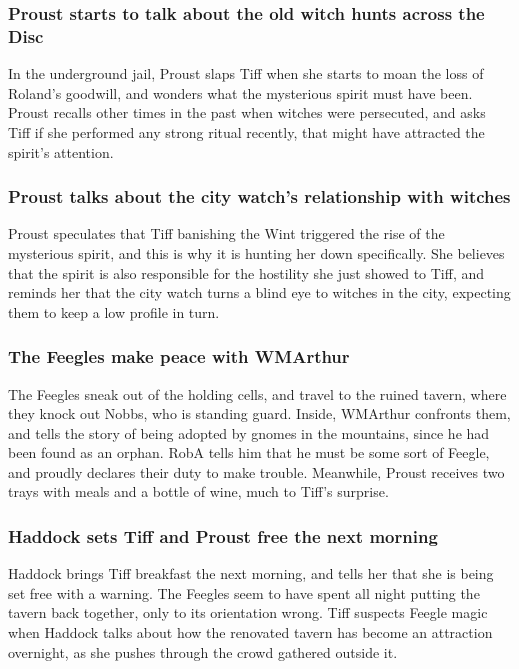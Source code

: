 \subsubsection{\Gls{Proust} starts to talk about the old witch hunts across the Disc}
In the underground jail, \Gls{Proust} slaps \Gls{Tiff} when she starts to moan the loss of
\Gls{Roland}'s goodwill, and wonders what the mysterious spirit must have been. \Gls{Proust} recalls
other times in the past when witches were persecuted, and asks \Gls{Tiff} if she performed any
strong ritual recently, that might have attracted the spirit's attention.

\subsubsection{\Gls{Proust} talks about the city watch's relationship with witches}
\Gls{Proust} speculates that \Gls{Tiff} banishing the \Gls{Wint} triggered the rise of the
mysterious spirit, and this is why it is hunting her down specifically. She believes that the spirit
is also responsible for the hostility she just showed to \Gls{Tiff}, and reminds her that the city
watch turns a blind eye to witches in the city, expecting them to keep a low profile in turn.

\subsubsection{The Feegles make peace with \Gls{WMArthur}}
The Feegles sneak out of the holding cells, and travel to the ruined tavern, where they knock out
\Gls{Nobbs}, who is standing guard. Inside, \Gls{WMArthur} confronts them, and tells the story of
being adopted by gnomes in the mountains, since he had been found as an orphan. \Gls{RobA} tells him
that he must be some sort of Feegle, and proudly declares their duty to make trouble. Meanwhile,
\Gls{Proust} receives two trays with meals and a bottle of wine, much to \Gls{Tiff}'s surprise.

\subsubsection{\Gls{Haddock} sets \Gls{Tiff} and \Gls{Proust} free the next morning}
\Gls{Haddock} brings \Gls{Tiff} breakfast the next morning, and tells her that she is being set
free with a warning. The Feegles seem to have spent all night putting the tavern back together,
only to its orientation wrong. \Gls{Tiff} suspects Feegle magic when \Gls{Haddock} talks about how
the renovated tavern has become an attraction overnight, as she pushes through the crowd gathered
outside it.

